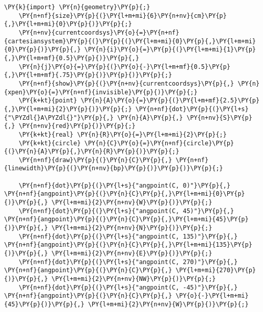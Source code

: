 \begin{Verbatim}[commandchars=\\\{\}]
    \PY{k}{import} \PY{n}{geometry}\PY{p}{;}
    \PY{n+nf}{size}\PY{p}{(}\PY{l+m+mi}{6}\PY{n+nv}{cm}\PY{p}{,}\PY{l+m+mi}{0}\PY{p}{)}\PY{p}{;}
    \PY{n+nv}{currentcoordsys}\PY{o}{=}\PY{n+nf}{cartesiansystem}\PY{p}{(}\PY{p}{(}\PY{l+m+mi}{0}\PY{p}{,}\PY{l+m+mi}{0}\PY{p}{)}\PY{p}{,} \PY{n}{i}\PY{o}{=}\PY{p}{(}\PY{l+m+mi}{1}\PY{p}{,}\PY{l+m+mf}{0.5}\PY{p}{)}\PY{p}{,}
    \PY{n}{j}\PY{o}{=}\PY{p}{(}\PY{o}{-}\PY{l+m+mf}{0.5}\PY{p}{,}\PY{l+m+mf}{.75}\PY{p}{)}\PY{p}{)}\PY{p}{;}
    \PY{n+nf}{show}\PY{p}{(}\PY{n+nv}{currentcoordsys}\PY{p}{,} \PY{n}{xpen}\PY{o}{=}\PY{n+nf}{invisible}\PY{p}{)}\PY{p}{;}
    \PY{k+kt}{point} \PY{n}{A}\PY{o}{=}\PY{p}{(}\PY{l+m+mf}{2.5}\PY{p}{,}\PY{l+m+mi}{2}\PY{p}{)}\PY{p}{;} \PY{n+nf}{dot}\PY{p}{(}\PY{l+s}{"\PYZdl{}A\PYZdl{}"}\PY{p}{,} \PY{n}{A}\PY{p}{,} \PY{n+nv}{S}\PY{p}{,} \PY{n+nv}{red}\PY{p}{)}\PY{p}{;}
    \PY{k+kt}{real} \PY{n}{R}\PY{o}{=}\PY{l+m+mi}{2}\PY{p}{;}
    \PY{k+kt}{circle} \PY{n}{C}\PY{o}{=}\PY{n+nf}{circle}\PY{p}{(}\PY{n}{A}\PY{p}{,}\PY{n}{R}\PY{p}{)}\PY{p}{;}
    \PY{n+nf}{draw}\PY{p}{(}\PY{n}{C}\PY{p}{,} \PY{n+nf}{linewidth}\PY{p}{(}\PY{n+nv}{bp}\PY{p}{)}\PY{p}{)}\PY{p}{;}

    \PY{n+nf}{dot}\PY{p}{(}\PY{l+s}{"angpoint(C, 0)"}\PY{p}{,} \PY{n+nf}{angpoint}\PY{p}{(}\PY{n}{C}\PY{p}{,}\PY{l+m+mi}{0}\PY{p}{)}\PY{p}{,} \PY{l+m+mi}{2}\PY{n+nv}{W}\PY{p}{)}\PY{p}{;}
    \PY{n+nf}{dot}\PY{p}{(}\PY{l+s}{"angpoint(C, 45)"}\PY{p}{,} \PY{n+nf}{angpoint}\PY{p}{(}\PY{n}{C}\PY{p}{,}\PY{l+m+mi}{45}\PY{p}{)}\PY{p}{,} \PY{l+m+mi}{2}\PY{n+nv}{N}\PY{p}{)}\PY{p}{;}
    \PY{n+nf}{dot}\PY{p}{(}\PY{l+s}{"angpoint(C, 135)"}\PY{p}{,} \PY{n+nf}{angpoint}\PY{p}{(}\PY{n}{C}\PY{p}{,}\PY{l+m+mi}{135}\PY{p}{)}\PY{p}{,} \PY{l+m+mi}{2}\PY{n+nv}{E}\PY{p}{)}\PY{p}{;}
    \PY{n+nf}{dot}\PY{p}{(}\PY{l+s}{"angpoint(C, 270)"}\PY{p}{,} \PY{n+nf}{angpoint}\PY{p}{(}\PY{n}{C}\PY{p}{,} \PY{l+m+mi}{270}\PY{p}{)}\PY{p}{,} \PY{l+m+mi}{2}\PY{n+nv}{NW}\PY{p}{)}\PY{p}{;}
    \PY{n+nf}{dot}\PY{p}{(}\PY{l+s}{"angpoint(C, -45)"}\PY{p}{,} \PY{n+nf}{angpoint}\PY{p}{(}\PY{n}{C}\PY{p}{,} \PY{o}{-}\PY{l+m+mi}{45}\PY{p}{)}\PY{p}{,} \PY{l+m+mi}{2}\PY{n+nv}{W}\PY{p}{)}\PY{p}{;}
\end{Verbatim}
